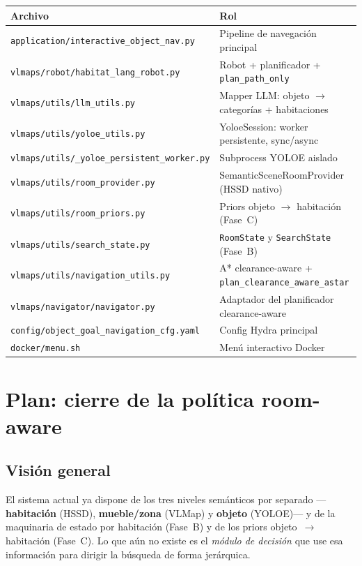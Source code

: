 \documentclass[11pt,a4paper]{article}
\begin{document}
\begin{center}
\begin{tabular}{ll}
\toprule
\textbf{Archivo} & \textbf{Rol} \\
\midrule
\texttt{application/interactive\_object\_nav.py} &
  Pipeline de navegación principal \\
\texttt{vlmaps/robot/habitat\_lang\_robot.py} &
  Robot + planificador + \texttt{plan\_path\_only} \\
\texttt{vlmaps/utils/llm\_utils.py} &
  Mapper LLM: objeto $\rightarrow$ categorías + habitaciones \\
\texttt{vlmaps/utils/yoloe\_utils.py} &
  YoloeSession: worker persistente, sync/async \\
\texttt{vlmaps/utils/\_yoloe\_persistent\_worker.py} &
  Subprocess YOLOE aislado \\
\texttt{vlmaps/utils/room\_provider.py} &
  SemanticSceneRoomProvider (HSSD nativo) \\
\texttt{vlmaps/utils/room\_priors.py} &
  Priors objeto $\rightarrow$ habitación (Fase~C) \\
\texttt{vlmaps/utils/search\_state.py} &
  \texttt{RoomState} y \texttt{SearchState} (Fase~B) \\
\texttt{vlmaps/utils/navigation\_utils.py} &
  A* clearance-aware + \texttt{plan\_clearance\_aware\_astar} \\
\texttt{vlmaps/navigator/navigator.py} &
  Adaptador del planificador clearance-aware \\
\texttt{config/object\_goal\_navigation\_cfg.yaml} &
  Config Hydra principal \\
\texttt{docker/menu.sh} &
  Menú interactivo Docker \\
\bottomrule
\end{tabular}
\end{center}

\section{Plan: cierre de la política room-aware}
\label{sec:room-aware}

\subsection{Visión general}

El sistema actual ya dispone de los tres niveles semánticos por separado
---\textbf{habitación} (HSSD), \textbf{mueble/zona} (VLMap) y \textbf{objeto}
(YOLOE)--- y de la maquinaria de estado por habitación (Fase~B) y de los
priors objeto~$\rightarrow$ habitación (Fase~C). Lo que aún no existe es el
\emph{módulo de decisión} que use esa información para dirigir la búsqueda
de forma jerárquica.
\end{document}
